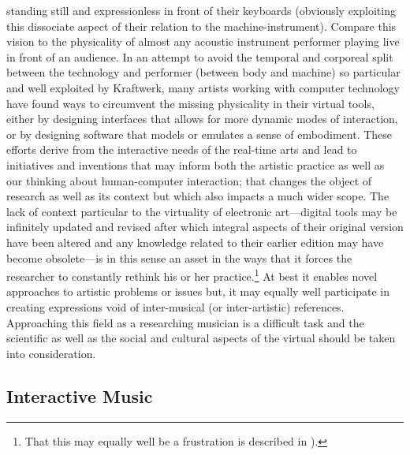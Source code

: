 standing still and expressionless in front of their keyboards (obviously exploiting this dissociate aspect of their relation to the machine-instrument). Compare this vision to the physicality of almost any acoustic instrument performer playing live in front of an audience. In an attempt to avoid the temporal and corporeal split between the technology and performer (between body and machine) so particular and well exploited by Kraftwerk, many artists working with computer technology have found ways to circumvent the missing physicality in their virtual tools, either by designing interfaces that allows for more dynamic modes of interaction, or by designing software that models or emulates a sense of embodiment. These efforts derive from the interactive needs of the real-time arts and lead to initiatives and inventions that may inform both the artistic practice as well as our thinking about human-computer interaction; that changes the object of research as well as its context but which also impacts a much wider scope. The lack of context particular to the virtuality of electronic art---digital tools may be infinitely updated and revised after which integral aspects of their original version have been altered and any knowledge related to their earlier edition may have become obsolete---is in this sense an asset in the ways that it forces the researcher to constantly rethink his or her practice.\footnote{That this may equally well be a frustration is described in \citet{ostertag02}).} At best it enables novel approaches to artistic problems or issues  but, it may equally well participate in creating expressions void of inter-musical (or inter-artistic) references. Approaching this field as a researching musician is a difficult task and the scientific as well as the social and cultural aspects of the virtual should be taken into consideration. %

\subsection*{Interactive Music}
\label{sec:interactive-music}

